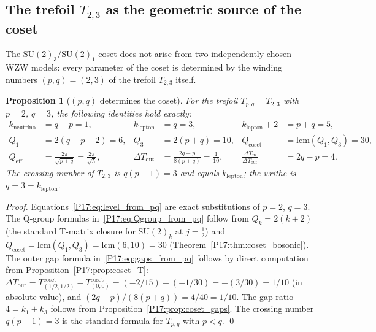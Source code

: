 \documentclass[11pt,a4paper]{article}
\newtheorem{proposition}[theorem]{Proposition}
\theoremstyle{definition}\newtheorem{definition}[theorem]{Definition}
\theoremstyle{remark}
\newcommand{\SU}{\mathrm{SU}}
\begin{document}
\subsection{The trefoil $T_{2,3}$ as the geometric source of the coset}
\label{P17:sec:coset_trefoil}

The $\SU(2)_3/\SU(2)_1$ coset does not arise from two independently
chosen WZW models: every parameter of the coset is determined by the
winding numbers $(p,q)=(2,3)$ of the trefoil $T_{2,3}$ itself.

\begin{proposition}[$(p,q)$ determines the coset]
\label{P17:prop:pq_coset}
For the trefoil $T_{p,q}=T_{2,3}$ with $p=2$, $q=3$, the following
identities hold exactly:
\begin{align}
  k_{\mathrm{neutrino}} &= q - p = 1, &
  k_{\mathrm{lepton}} &= q = 3, &
  k_{\mathrm{lepton}}+2 &= p+q = 5, \label{P17:eq:level_from_pq}\\
  Q_1 &= 2(q-p+2) = 6, &
  Q_3 &= 2(p+q) = 10, &
  Q_{\mathrm{coset}} &= \mathrm{lcm}(Q_1,Q_3) = 30,
  \label{P17:eq:Qgroup_from_pq}\\
  Q_{\mathrm{eff}} &= \frac{2\pi}{\sqrt{p+q}} = \frac{2\pi}{\sqrt{5}}, &
  \Delta T_{\mathrm{out}} &= \frac{2q-p}{8(p+q)} = \frac{1}{10}, &
  \frac{\Delta T_{\mathrm{in}}}{\Delta T_{\mathrm{out}}} &= 2q-p = 4.
  \label{P17:eq:gaps_from_pq}
\end{align}
The crossing number of $T_{2,3}$ is $q(p-1)=3$ and equals
$k_{\mathrm{lepton}}$; the writhe is $q=3=k_{\mathrm{lepton}}$.
\end{proposition}

\begin{proof}
Equations~\eqref{P17:eq:level_from_pq} are exact substitutions of
$p=2$, $q=3$. The Q-group formulas in~\eqref{P17:eq:Qgroup_from_pq}
follow from $Q_k=2(k+2)$ (the standard T-matrix closure for $\SU(2)_k$
at $j=\frac{1}{2}$) and $Q_{\mathrm{coset}}=\mathrm{lcm}(Q_1,Q_3)=
\mathrm{lcm}(6,10)=30$ (Theorem~\ref{P17:thm:coset_bosonic}).  The
outer gap formula in~\eqref{P17:eq:gaps_from_pq} follows by direct
computation from Proposition~\ref{P17:prop:coset_T}:
$\Delta T_{\mathrm{out}}=T^{\mathrm{coset}}_{(1/2,1/2)}
-T^{\mathrm{coset}}_{(0,0)}=(-2/15)-(-1/30)=-(3/30)=1/10$
(in absolute value),
and $(2q-p)/(8(p+q))=4/40=1/10$.  The gap ratio $4=k_1+k_3$
follows from Proposition~\ref{P17:prop:coset_gaps}.  The crossing
number $q(p-1)=3$ is the standard formula for $T_{p,q}$ with $p<q$.
\qed
\end{proof}
\end{document}
